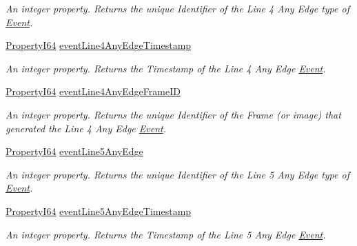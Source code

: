 \begin{DoxyCompactItemize}
\begin{DoxyCompactList}\small\item\em An integer property. Returns the unique Identifier of the Line 4 Any Edge type of \hyperlink{classmv_i_m_p_a_c_t_1_1acquire_1_1_event}{Event}. \end{DoxyCompactList}\item 
\hyperlink{group___common_interface_ga81749b2696755513663492664a18a893}{Property\+I64} \hyperlink{classmv_i_m_p_a_c_t_1_1acquire_1_1_gen_i_cam_1_1_event_control_ac88fabc4a323fff0ed7779412b097548}{event\+Line4\+Any\+Edge\+Timestamp}
\begin{DoxyCompactList}\small\item\em An integer property. Returns the Timestamp of the Line 4 Any Edge \hyperlink{classmv_i_m_p_a_c_t_1_1acquire_1_1_event}{Event}. \end{DoxyCompactList}\item 
\hyperlink{group___common_interface_ga81749b2696755513663492664a18a893}{Property\+I64} \hyperlink{classmv_i_m_p_a_c_t_1_1acquire_1_1_gen_i_cam_1_1_event_control_aed0e28fb21689ea4706e3f8ff70c5911}{event\+Line4\+Any\+Edge\+Frame\+I\+D}
\begin{DoxyCompactList}\small\item\em An integer property. Returns the unique Identifier of the Frame (or image) that generated the Line 4 Any Edge \hyperlink{classmv_i_m_p_a_c_t_1_1acquire_1_1_event}{Event}. \end{DoxyCompactList}\item 
\hyperlink{group___common_interface_ga81749b2696755513663492664a18a893}{Property\+I64} \hyperlink{classmv_i_m_p_a_c_t_1_1acquire_1_1_gen_i_cam_1_1_event_control_aed4f59ff460370876a91446f56a9e2d7}{event\+Line5\+Any\+Edge}
\begin{DoxyCompactList}\small\item\em An integer property. Returns the unique Identifier of the Line 5 Any Edge type of \hyperlink{classmv_i_m_p_a_c_t_1_1acquire_1_1_event}{Event}. \end{DoxyCompactList}\item 
\hyperlink{group___common_interface_ga81749b2696755513663492664a18a893}{Property\+I64} \hyperlink{classmv_i_m_p_a_c_t_1_1acquire_1_1_gen_i_cam_1_1_event_control_aa96cb2770ad9a4d4440cc9f5adf94e0c}{event\+Line5\+Any\+Edge\+Timestamp}
\begin{DoxyCompactList}\small\item\em An integer property. Returns the Timestamp of the Line 5 Any Edge \hyperlink{classmv_i_m_p_a_c_t_1_1acquire_1_1_event}{Event}. \end{DoxyCompactList}\item 

\end{DoxyCompactItemize}
